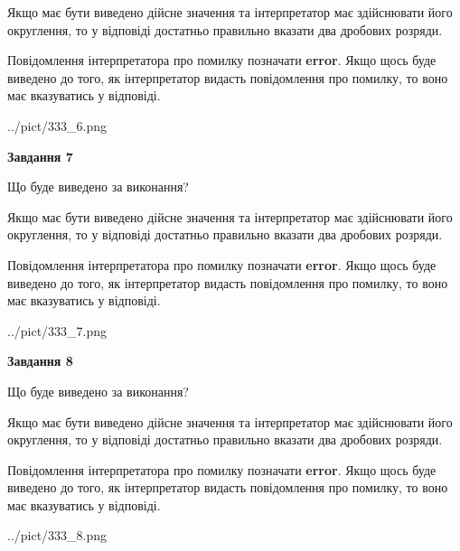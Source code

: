 \documentclass[12pt, ukrainian]{article}
\begin{document}
{\begin {Large}
Якщо має бути виведено дійсне значення та інтерпретатор має здійснювати його округлення, 
то у відповіді достатньо правильно вказати два дробових розряди.

Повідомлення інтерпретатора про помилку позначати \textbf{error}.
Якщо щось буде виведено до того, як інтерпретатор видасть повідомлення про помилку, 
то воно має вказуватись у відповіді. \par

\begin{center}
	{../pict/333_6.png}
\end{center}
\newpage

{\begin {center}\textbf{Завдання 7}\end {center}}\par
Що буде виведено за виконання? \par

Якщо має бути виведено дійсне значення та інтерпретатор має здійснювати його округлення, 
то у відповіді достатньо правильно вказати два дробових розряди.

Повідомлення інтерпретатора про помилку позначати \textbf{error}.
Якщо щось буде виведено до того, як інтерпретатор видасть повідомлення про помилку, 
то воно має вказуватись у відповіді. \par

\begin{center}
	{../pict/333_7.png}
\end{center}
\newpage

{\begin {center}\textbf{Завдання 8}\end {center}}\par
Що буде виведено за виконання? \par

Якщо має бути виведено дійсне значення та інтерпретатор має здійснювати його округлення, 
то у відповіді достатньо правильно вказати два дробових розряди.

Повідомлення інтерпретатора про помилку позначати \textbf{error}.
Якщо щось буде виведено до того, як інтерпретатор видасть повідомлення про помилку, 
то воно має вказуватись у відповіді. \par

\begin{center}
	{../pict/333_8.png}
\end{center}
\newpage


\end{Large}}
\end{document}
